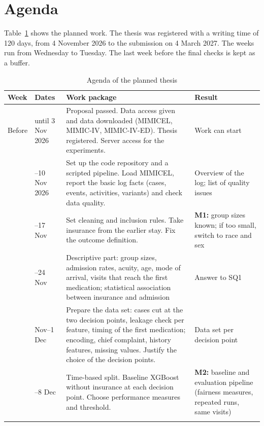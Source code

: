 \section{Agenda}\label{section::agenda}

Table~\ref{table::agenda} shows the planned work. The thesis was registered with a writing time of 120 days, from 4 November 2026 to the submission on 4 March 2027. The weeks run from Wednesday to Tuesday. The last week before the final checks is kept as a buffer.

\begin{table}[htbp]
  \centering
  \footnotesize
  \caption{Agenda of the planned thesis}\label{table::agenda}
  \begin{tabularx}{\textwidth}{@{}>{\raggedright\arraybackslash}p{0.9cm}>{\raggedright\arraybackslash}p{2.6cm}>{\raggedright\arraybackslash}X>{\raggedright\arraybackslash}p{3.4cm}@{}}
    \toprule
    \textbf{Week} & \textbf{Dates} & \textbf{Work package} & \textbf{Result} \\
    \midrule
    Before & until 3 Nov 2026 & Proposal passed. Data access given and data downloaded (MIMICEL, MIMIC-IV, MIMIC-IV-ED). Thesis registered. Server access for the experiments. & Work can start \\ \addlinespace[0.3ex]
    1 & 4--10 Nov 2026 & Set up the code repository and a scripted pipeline. Load MIMICEL, report the basic log facts (cases, events, activities, variants) and check data quality. & Overview of the log; list of quality issues \\ \addlinespace[0.3ex]
    2 & 11--17 Nov & Set cleaning and inclusion rules. Take insurance from the earlier stay. Fix the outcome definition. & \textbf{M1:} group sizes known; if too small, switch to race and sex \\ \addlinespace[0.3ex]
    3 & 18--24 Nov & Descriptive part: group sizes, admission rates, acuity, age, mode of arrival, visits that reach the first medication; statistical association between insurance and admission & Answer to SQ1 \\ \addlinespace[0.3ex]
    4 & 25 Nov--1 Dec & Prepare the data set: cases cut at the two decision points, leakage check per feature, timing of the first medication; encoding, chief complaint, history features, missing values. Justify the choice of the decision points. & Data set per decision point \\ \addlinespace[0.3ex]
    5 & 2--8 Dec & Time-based split. Baseline XGBoost without insurance at each decision point. Choose performance measures and threshold. & \textbf{M2:} baseline and evaluation pipeline (fairness measures, repeated runs, same visits) \\ \addlinespace[0.3ex]

\end{tabularx}
\end{table}
